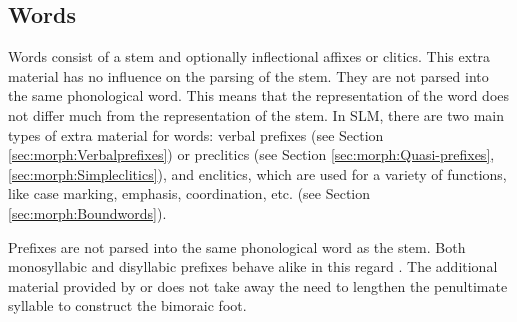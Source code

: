 \subsection{Words}\label{sec:phon:analysis:Words}
Words consist of a stem and optionally inflectional affixes or clitics. This extra material has no influence on the parsing of the stem. They are not parsed into the same phonological word. This means that the representation of the word does not differ much from the representation of the stem. In SLM, there are two main types of extra material for words: verbal prefixes (see Section \ref{sec:morph:Verbalprefixes}) or preclitics (see Section \ref{sec:morph:Quasi-prefixes},\ref{sec:morph:Simpleclitics}), and enclitics, which are used for a variety of functions, like case marking, emphasis, coordination, etc. (see Section \ref{sec:morph:Boundwords}).

Prefixes are not parsed into the same phonological word as the stem. Both monosyllabic and disyllabic prefixes behave alike in this regard . The additional material provided by  or  does not take away the need to lengthen the penultimate syllable to construct the bimoraic foot.


